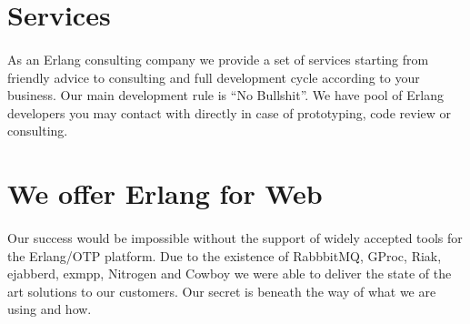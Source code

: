 \documentclass[11pt]{article}
\begin{document}
\section*{Services}
\paragraph{}
As an Erlang consulting company we provide a set of services starting from friendly advice to
consulting and full development cycle according to your business.
Our main development rule is ``No Bullshit''.
We have pool of Erlang developers you may contact with directly in case of
prototyping, code review or consulting.



\section*{We offer Erlang for Web}
\paragraph{}
Our success would be impossible without the support of widely accepted tools for the Erlang/OTP platform.
Due to the existence of RabbbitMQ, GProc, Riak, ejabberd, exmpp, Nitrogen and
Cowboy we were able to deliver the state of the art solutions to our customers.
Our secret is beneath the way of what we are using and how.



\end{document}
